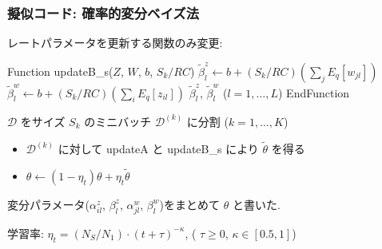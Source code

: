\documentclass[dvipdfmx, dvipsnames]{beamer}
\begin{document}
\begin{frame}[fragile=singleslide]
\frametitle{擬似コード: 確率的変分ベイズ法}

レートパラメータを更新する関数のみ変更: 

\begin{algorithmic}
\State Function {updateB\_s($Z$, $W$, $b$, $S_k/RC$)}
    \State $\tilde \beta^z_{l}  \leftarrow  b + (S_k/RC)(\sum_j E_q[w_{jl}])$
    \State $\tilde \beta^w_{l}  \leftarrow b + (S_k/RC)(\sum_i E_q[z_{il}])$ 
 \EndFor
  \State \Return $\tilde \beta^z_{l} $, $\tilde \beta^w_{l}$ ($l=1,\ldots , L$) 
  \State EndFunction
\end{algorithmic}


\vfill

$\mathcal{D}$ をサイズ $S_k$ のミニバッチ $\mathcal{D}^{(k)}$ に分割 ($k=1,\ldots, K$)

\begin{itemize}
\item $\mathcal{D}^{(k)}$ に対して updateA と updateB\_s により $ \tilde \theta$ を得る
\item $ \theta \leftarrow (1-\eta_t) \theta + \eta_t  \tilde \theta$
\end{itemize}

変分パラメータ($\alpha^z_{il}$, $\beta^z_{l}$, $\alpha^w_{jl}$, $\beta^w_{l}$)をまとめて $\theta$ と書いた.

\vfill

学習率: $\eta_t = (N_S/N_1) \cdot (t+\tau)^{-\kappa}$, ( $\tau \ge 0$, $\kappa \in [0.5,1]$)
\end{frame}
\end{document}
